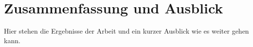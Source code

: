 \chapter{Zusammenfassung und Ausblick}
\label{sec:Zusammenfassung}
Hier stehen die Ergebnisse der Arbeit und ein kurzer Ausblick wie es weiter gehen kann.